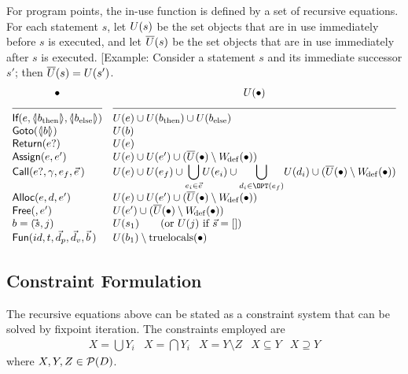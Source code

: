 \begin{docpart}
For program points, the in-use function is defined by a set of
recursive equations. For each statement $s$, let $U(s)$ be the set
objects that are in use immediately before $s$ is executed, and let
$\overline{U}(s)$ be the set objects that are in use immediately
after $s$ is executed. [Example: Consider a statement $s$ and its
immediate successor $s'$; then $\overline{U}(s) = U(s')$.
\[
\begin{array}{ll}
  \hfil \bullet & \hfil \Use(\bullet)  \\
  \hrulefill & \hrulefill \\
  \cons{If}(e,\coreXref{b_{\mathrm{then}}},
  \coreXref{b_{\mathrm{else}}}) & \Use(e) \cup \Use(b_{\mathrm{then}}) \cup
  \Use(b_{\mathrm{else}}) \\
  \cons{Goto}(\coreXref b) & \Use(b) \\
  \cons{Return}(e?) & \Use(e) \\
  \cons{Assign}(e,e') & \Use(e) \cup \Use(e') \cup
  (\overline{\Use}(\bullet) \setminus \Wdef(\bullet)) \\
  \cons{Call}(e?,\gamma,e_f,\vec e\,) & \Use(e) \cup \Use(e_f) \cup
  {\displaystyle \bigcup_{e_i \in \vec e}} \Use(e_i) \cup
  {\displaystyle \bigcup_{d_i \in \OPT(e_f)}} \Use(d_i) \cup
  (\overline{\Use}(\bullet) \setminus
  \Wdef(\bullet)) \\  
  \cons{Alloc}(e,d,e') & \Use(e) \cup \Use(e') \cup
  (\overline{\Use}(\bullet) \setminus \Wdef(\bullet)) \\
  \cons{Free}(,e') & \Use(e') \cup (\overline{\Use}(\bullet) \setminus
  \Wdef(\bullet)) \\ 
  b = (\vec s,j) & \Use(s_1) \qquad (\mbox{or } \Use(j) \mbox{ if }
  \vec s = []) \\
  \cons{Fun}(id,t,\vec d_p,\vec d_v,\vec b\,) &
  \Use(b_1) \setminus \trulylocal(\bullet) \\
\end{array}
\]

\subsection{Constraint Formulation}
The recursive equations above can be stated as a constraint system
that can be solved by fixpoint iteration. The constraints employed are
\[
\begin{array}{ccccc}
X = \bigcup Y_i &
X = \bigcap Y_i &
X = Y \setminus Z &
X \subseteq Y &
X \supseteq Y
\end{array}
\]
where $X,Y,Z \in \mathcal{P}(D)$. 


\end{docpart}
